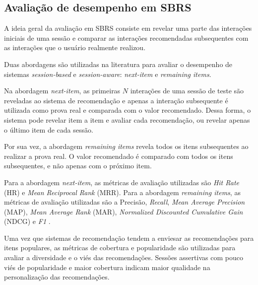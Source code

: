 
  \subsection{Avaliação de desempenho em SBRS} \label{chap:desempenho}
  A ideia geral da avaliação em SBRS consiste em revelar uma parte das interações
  iniciais de uma sessão e comparar as interações recomendadas subsequentes com
  as interações que o usuário realmente realizou.
  
  Duas abordagens são utilizadas na literatura para avaliar o desempenho de
  sistemas \textit{session-based} e \textit{session-aware}: \textit{next-item}
  e \textit{remaining items}.

  Na abordagem \textit{next-item}, as primeiras $N$ interações de uma sessão de
  teste são reveladas ao sistema de recomendação e apenas a interação
  subsequente é utilizada como prova real e comparada com o valor recomendado.
  Dessa forma, o sistema pode revelar item a item e avaliar cada recomendação,
  ou revelar apenas o último item de cada sessão.

  Por sua vez, a abordagem \textit{remaining items} revela todos os itens
  subsequentes ao realizar a prova real. O valor recomendado é comparado
  com todos os itens subsequentes, e não apenas com o próximo item.

   
    Para a abordagem \textit{next-item}, as métricas
  de avaliação utilizadas são \textit{Hit Rate} (HR) e \textit{Mean Reciprocal
  Rank} (MRR). Para a abordagem \textit{remaining items}, as métricas de
  avaliação utilizadas são a Precisão, \textit{Recall}, \textit{Mean Average
  Precision} (MAP), \textit{Mean Average Rank} (MAR), \textit{Normalized
  Discounted Cumulative Gain} (NDCG) e \textit{F1} \cite{sessionbaseddp}.

  Uma vez que sistemas de recomendação tendem a enviesar as recomendações para
  itens populares, as métricas de cobertura e popularidade são utilizadas para
  avaliar a diversidade e o viés das recomendações. Sessões assertivas com pouco
  viés de popularidade e maior cobertura indicam maior qualidade na
  personalização das recomendações.

